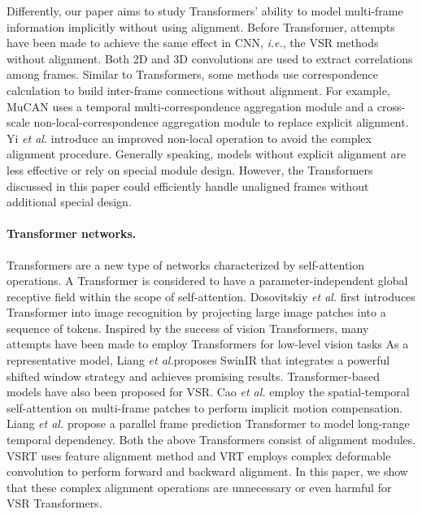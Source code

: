 \documentclass{article}
\newcommand{\ie}{\emph{i.e.}}    \newcommand{\eg}{\emph{e.g.}}    \newcommand{\vs}{\emph{v.s.}}    \newcommand{\etc}{\emph{etc}}     \newcommand{\wo}{\emph{w/o}}     \newcommand{\wi}{\emph{w/}}      \newcommand{\wrt}{\emph{w.r.t.}} \def\etal{\emph{et al.}}
\begin{document}
Differently, our paper aims to study Transformers' ability to model multi-frame information implicitly without using alignment.
Before Transformer, attempts have been made to achieve the same effect in CNN, \ie, the VSR methods without alignment.
Both 2D \cite{lucas2019generative,yan2019frame} and 3D convolutions \cite{tran2015learning,jo2018deep,li2019fast,kim2018spatio} are used to extract correlations among frames.
Similar to Transformers, some methods use correspondence calculation to build inter-frame connections without alignment.
For example, MuCAN \cite{li2020mucan} uses a temporal multi-correspondence aggregation module and a cross-scale non-local-correspondence aggregation module to replace explicit alignment.
Yi \etal \cite{yi2019progressive} introduce an improved non-local operation to avoid the complex alignment procedure.
Generally speaking, models without explicit alignment are less effective or rely on special module design.
However, the Transformers discussed in this paper could efficiently handle unaligned frames without additional special design.


\vspace{-2mm}
\paragraph{Transformer networks.}
Transformers \cite{vaswani2017attention} are a new type of networks characterized by self-attention operations.
A Transformer is considered to have a parameter-independent global receptive field within the scope of self-attention.
Dosovitskiy \etal \cite{dosovitskiy2020image} first introduces Transformer into image recognition by projecting large image patches into a sequence of tokens.
Inspired by the success of vision Transformers, many attempts have been made to employ Transformers for low-level vision tasks \cite{yang2020learning,zamir2021restormer,chen2021pre,wang2021uformer,zhang2022accurate,chen2022cross}
As a representative model, Liang \etal proposes SwinIR \cite{liang2021swinir} that integrates a powerful shifted window strategy and achieves promising results. 
Transformer-based models have also been proposed for VSR.
Cao \etal \cite{cao2021video} employ the spatial-temporal self-attention on multi-frame patches to perform implicit motion compensation.
Liang \etal \cite{liang2022vrt} propose a parallel frame prediction Transformer to model long-range temporal dependency.
Both the above Transformers consist of alignment modules.
VSRT \cite{cao2021video} uses feature alignment method and VRT \cite{liang2022vrt} employs complex deformable convolution to perform forward and backward alignment.
In this paper, we show that these complex alignment operations are unnecessary or even harmful for VSR Transformers.
\end{document}
